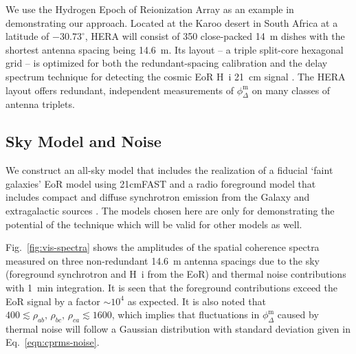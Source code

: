 \documentclass[
reprint,
superscriptaddress,
amsmath,
amssymb,
aps,
prd
]{revtex4-1}
\begin{document}
We use the Hydrogen Epoch of Reionization Array \cite[HERA;][]{deb17,thy16,ewa16,neb16,patra17} as an example in demonstrating our approach. Located at the Karoo desert in South Africa at a latitude of $-30.73^\circ$, HERA will consist of 350 close-packed 14~m dishes with the shortest antenna spacing being 14.6~m. Its layout -- a triple split-core hexagonal grid -- is optimized for both the redundant-spacing calibration and the delay spectrum technique for detecting the cosmic EoR H~{\sc i} 21~cm signal \cite{dil16}. The HERA layout offers redundant, independent measurements of $\phi_\Delta^\textrm{m}$ on many classes of antenna triplets. 

\subsection{Sky Model and Noise}\label{sec:skymodel-noise}

We construct an all-sky model that includes the realization of a fiducial `faint galaxies' EoR model \cite{gre17} using 21cmFAST \cite{mes11} and a radio foreground model that includes compact and diffuse synchrotron emission from the Galaxy and extragalactic sources \cite{thy15a}. The models chosen here are only for demonstrating the potential of the technique which will be valid for other models as well.

Fig.~\ref{fig:vis-spectra} shows the amplitudes of the spatial coherence spectra measured on three non-redundant 14.6~m antenna spacings due to the sky (foreground synchrotron and H~{\sc i} from the EoR) and thermal noise contributions with 1~min integration. It is seen that the foreground contributions exceed the EoR signal by a factor $\sim 10^4$ as expected. It is also noted that $400\lesssim \rho_{ab},\,\rho_{bc},\,\rho_{ca} \lesssim 1600$, which implies that fluctuations in $\phi_\Delta^\textrm{m}$ caused by thermal noise will follow a Gaussian distribution with standard deviation given in Eq.~\ref{eqn:cprms-noise}.
\end{document}
